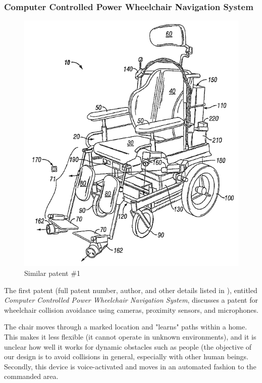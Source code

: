 \documentclass[oneside,final,a4paper]{report}
\begin{document}
\subsubsection{Computer Controlled Power Wheelchair Navigation System}
\begin{figure}[hbt]
 \centering
 \includegraphics[scale=0.25]{patents}
 \caption{Similar patent \#1 \cite{patent:computer_controlled}}
\end{figure}

The first patent (full patent number, author, and other details listed in \cite{patent:computer_controlled}), entitled \emph{Computer Controlled Power Wheelchair Navigation System}, discusses a patent for wheelchair collision avoidance using cameras, proximity sensors, and microphones.

The chair moves through a marked location and "learns" paths within a home. This makes it less flexible (it cannot operate in unknown environments), and it is unclear how well it works for dynamic obstacles such as people (the objective of our design is to avoid collisions in general, especially with other human beings. Secondly, this device is voice-activated and moves in an automated fashion to the commanded area.
\end{document}
